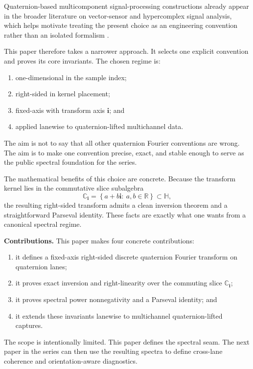 \documentclass[11pt]{article}
\theoremstyle{remark}
\newcommand{\R}{\mathbb{R}}
\newcommand{\C}{\mathbb{C}}
\newcommand{\HH}{\mathbb{H}}
\newcommand{\Ci}{\C_{\mathbf{i}}}
\newcommand{\ii}{\mathbf{i}}
\newcommand{\set}[1]{\left\{ #1 \right\}}
\begin{document}
Quaternion-based multicomponent signal-processing constructions already appear in the broader literature on vector-sensor and hypercomplex signal analysis, which helps motivate treating the present choice as an engineering convention rather than an isolated formalism \citep{lebihan2004,ell2007}.

This paper therefore takes a narrower approach. It selects one explicit convention and proves its core invariants. The chosen regime is:
\begin{enumerate}[label=(\roman*)]
    \item one-dimensional in the sample index;
    \item right-sided in kernel placement;
    \item fixed-axis with transform axis \(\ii\); and
    \item applied lanewise to quaternion-lifted multichannel data.
\end{enumerate}
The aim is not to say that all other quaternion Fourier conventions are wrong. The aim is to make one convention precise, exact, and stable enough to serve as the public spectral foundation for the series.

The mathematical benefits of this choice are concrete. Because the transform kernel lies in the commutative slice subalgebra
\[
\Ci=\set{a+b\ii:\ a,b\in\R}\subset\HH,
\]
the resulting right-sided transform admits a clean inversion theorem and a straightforward Parseval identity. These facts are exactly what one wants from a canonical spectral regime.

\medskip
\noindent\textbf{Contributions.}
This paper makes four concrete contributions:
\begin{enumerate}[label=(\arabic*)]
    \item it defines a fixed-axis right-sided discrete quaternion Fourier transform on quaternion lanes;
    \item it proves exact inversion and right-linearity over the commuting slice \(\Ci\);
    \item it proves spectral power nonnegativity and a Parseval identity; and
    \item it extends these invariants lanewise to multichannel quaternion-lifted captures.
\end{enumerate}

The scope is intentionally limited. This paper defines the spectral seam. The next paper in the series can then use the resulting spectra to define cross-lane coherence and orientation-aware diagnostics.
\end{document}
